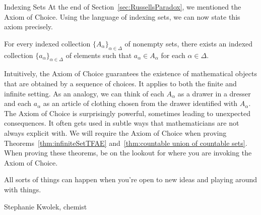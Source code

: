 \begin{section}{Indexing Sets}
At the end of Section~\ref{sec:RussellsParadox}, we mentioned the Axiom of Choice.  Using the language of indexing sets, we can now state this axiom precisely.

\begin{axiom}
For every indexed collection $\{A_{\alpha}\}_{\alpha\in\Delta}$ of nonempty sets, there exists an indexed collection $\{a_{\alpha}\}_{\alpha\in\Delta}$ of elements such that $a_{\alpha}\in A_{\alpha}$ for each $\alpha\in \Delta$.
\end{axiom}

Intuitively, the Axiom of Choice guarantees the existence of mathematical objects that are obtained by a sequence of choices. It applies to both the finite and infinite setting. As an analogy, we can think of each $A_{\alpha}$ as a drawer in a dresser and each $a_{\alpha}$ as an article of clothing chosen from the drawer identified with $A_{\alpha}$. The Axiom of Choice is surprisingly powerful, sometimes leading to unexpected consequences. It often gets used in subtle ways that mathematicians are not always explicit with.  We will require the Axiom of Choice when proving Theorems~\ref{thm:infiniteSetTFAE} and~\ref{thm:countable union of countable sets}. When proving these theorems, be on the lookout for where you are invoking the Axiom of Choice.

\epigraph{All sorts of things can happen when you're open to new ideas and playing around with things.}{Stephanie Kwolek, chemist}

\end{section}